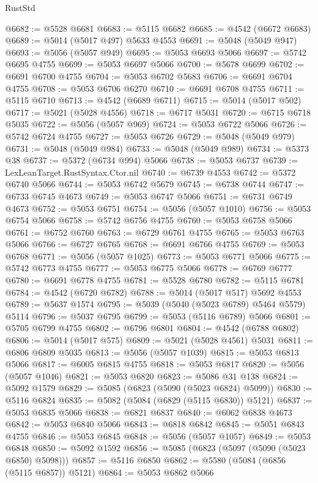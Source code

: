 \begin{lexlean}{RustStd}
\begin{coremodule}
@6682 := @5528 @6681
@6683 := @5115 @6682
@6685 := @4542 (@6672 @6683)
@6689 := @5014 (@5017 @497) @5633 @4553
@6691 := @5048 (@5049 @947)
@6693 := @5056 (@5057 @949)
@6695 := @5053 @6693 @5066
@6697 := @5742 @6695 @4755
@6699 := @5053 @6697 @5066
@6700 := @5678 @6699
@6702 := @6691 @6700 @4755
@6704 := @5053 @6702 @5683
@6706 := @6691 @6704 @4755
@6708 := @5053 @6706 @6270
@6710 := @6691 @6708 @4755
@6711 := @5115 @6710
@6713 := @4542 (@6689 @6711)
@6715 := @5014 (@5017 @502)
@6717 := @5021 (@5028 @4556)
@6718 := @6717 @5031
@6720 := @6715 @6718 @5035
@6722 := @5056 (@5057 @969)
@6724 := @5053 @6722 @5066
@6726 := @5742 @6724 @4755
@6727 := @5053 @6726
@6729 := @5048 (@5049 @979)
@6731 := @5048 (@5049 @984)
@6733 := @5048 (@5049 @989)
@6734 := @5373 @38
@6737 := @5372 (@6734 @994) @5066
@6738 := @5053 @6737
@6739 := LexLeanTarget.RustSyntax.Ctor.nil
@6740 := @6739 @4553
@6742 := @5372 @6740 @5066
@6744 := @5053 @6742 @5679
@6745 := @6738 @6744
@6747 := @6733 @6745 @4673
@6749 := @5053 @6747 @5066
@6751 := @6731 @6749 @4673
@6752 := @5053 @6751
@6754 := @5056 (@5057 @1010)
@6756 := @5053 @6754 @5066
@6758 := @5742 @6756 @4755
@6760 := @5053 @6758 @5066
@6761 := @6752 @6760
@6763 := @6729 @6761 @4755
@6765 := @5053 @6763 @5066
@6766 := @6727 @6765
@6768 := @6691 @6766 @4755
@6769 := @5053 @6768
@6771 := @5056 (@5057 @1025)
@6773 := @5053 @6771 @5066
@6775 := @5742 @6773 @4755
@6777 := @5053 @6775 @5066
@6778 := @6769 @6777
@6780 := @6691 @6778 @4755
@6781 := @5528 @6780
@6782 := @5115 @6781
@6784 := @4542 (@6720 @6782)
@6788 := @5014 (@5017 @517) @5692 @4553
@6789 := @5637 @1574
@6795 := @5039 (@5040 (@5023 @6789) @5464 @5579) @5114
@6796 := @5037 @6795
@6799 := @5053 (@5116 @6789) @5066
@6801 := @5705 @6799 @4755
@6802 := @6796 @6801
@6804 := @4542 (@6788 @6802)
@6806 := @5014 (@5017 @575)
@6809 := @5021 (@5028 @4561) @5031
@6811 := @6806 @6809 @5035
@6813 := @5056 (@5057 @1039)
@6815 := @5053 @6813 @5066
@6817 := @6005 @6815 @4755
@6818 := @5053 @6817
@6820 := @5056 (@5057 @1046)
@6821 := @5053 @6820
@6823 := @5086 @31 @138
@6824 := @5092 @1579
@6829 := @5085 (@6823 (@5090 (@5023 @6824) @5099))
@6830 := @5116 @6824
@6835 := @5082 (@5084 (@6829 (@5115 @6830)) @5121)
@6837 := @5053 @6835 @5066
@6838 := @6821 @6837
@6840 := @6062 @6838 @4673
@6842 := @5053 @6840 @5066
@6843 := @6818 @6842
@6845 := @5051 @6843 @4755
@6846 := @5053 @6845
@6848 := @5056 (@5057 @1057)
@6849 := @5053 @6848
@6850 := @5092 @1592
@6856 := @5085 (@6823 (@5097 (@5090 (@5023 @6850) @5098)))
@6857 := @5116 @6850
@6862 := @5580 (@5084 (@6856 (@5115 @6857)) @5121)
@6864 := @5053 @6862 @5066

\end{coremodule}
\end{lexlean}
